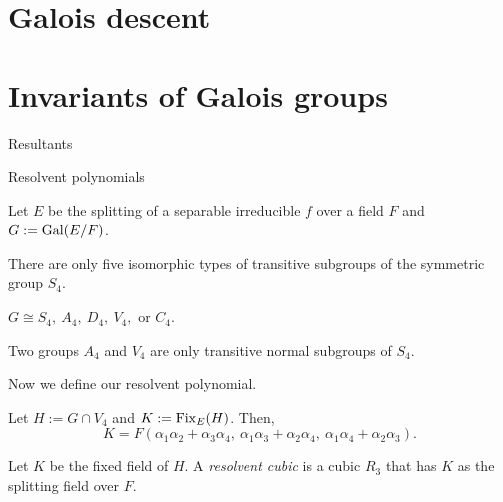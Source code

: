 \documentclass{../../large}
\begin{document}
\section{Galois descent}




\section{Invariants of Galois groups}

Resultants

Resolvent polynomials

\begin{prb}
\end{prb}
\begin{prb}
\end{prb}
\begin{prb}
\end{prb}
\begin{prb}
\end{prb}
\begin{prb}
\end{prb}


Let $E$ be the splitting of a separable irreducible $f$ over a field $F$ and $G:=\operatorname{Gal}(E/F)$.

\begin{thm}
There are only five isomorphic types of transitive subgroups of the symmetric group $S_4$.
\end{thm}
\begin{cor}
$G\cong S_4,\ A_4,\ D_4,\ V_4,\text{ or }C_4$.
\end{cor}
\begin{prop}
Two groups $A_4$ and $V_4$ are only transitive normal subgroups of $S_4$.
\end{prop}

Now we define our resolvent polynomial.
\begin{prop}
Let $H:=G\cap V_4$ and $K:=\operatorname{Fix}_E(H)$.
Then,
\[K=F(\alpha_1\alpha_2+\alpha_3\alpha_4,\ \alpha_1\alpha_3+\alpha_2\alpha_4,\ \alpha_1\alpha_4+\alpha_2\alpha_3).\]
\end{prop}
\begin{defn}
Let $K$ be the fixed field of $H$.
A \emph{resolvent cubic} is a cubic $R_3$ that has $K$ as the splitting field over $F$.
\end{defn}
\end{document}
